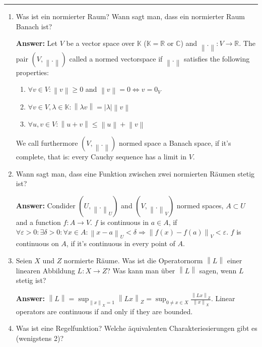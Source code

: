 \documentclass[11pt]{article}
\newcommand{\norm}[1]{\left\lVert#1\right\rVert}
\newcommand{\abs}[1]{\left|#1\right|}
\begin{document}


\medskip\hrule
\begin{enumerate}
    \item Was ist ein normierter Raum? Wann sagt man, dass ein normierter Raum Banach ist?

    \textbf{Answer:} Let $V$ be a vector space over $\mathbb{K}$ ($\mathbb{K} = \mathbb{R}$ or $\mathbb{C}$) and $\norm{.}\colon V \to \mathbb{R}$. The pair $(V, \norm{.})$ called a normed vectorspace if $\norm{.}$ satisfies the following properties:
    \begin{enumerate}
        \item $\forall v \in V\colon \norm{v} \ge 0$ and $\norm{v} = 0 \Leftrightarrow v = 0_V$
        \item $\forall v \in V, \lambda \in \mathbb{K}\colon \norm{\lambda v} = \abs{\lambda} \norm{v}$
        \item $\forall u, v \in V\colon \norm{u + v} \le \norm{u} + \norm{v}$
    \end{enumerate}
    We call furthermore $(V, \norm{.})$ normed space a Banach space, if it's complete, that is: every Cauchy sequence has a limit in $V$.

    \item Wann sagt man, dass eine Funktion zwischen zwei normierten Räumen stetig ist?

    \textbf{Answer:} Condider $(U, \norm{.}_U)$ and $(V, \norm{.}_V)$ normed spaces, $A \subset U$ and a function $f\colon A \to V$. $f$ is continuous in $a \in A$, if $\forall \varepsilon > 0\colon \exists \delta > 0\colon \forall x\in A\colon \norm{x - a}_U < \delta \Rightarrow \norm{f(x) - f(a)}_V < \varepsilon$. $f$ is continuous on $A$, if it's continuous in every point of $A$.

    \item Seien $X$ und $Z$ normierte Räume. Was ist die Operatornorm $\norm{L}$ einer linearen Abbildung $L\colon X \to Z$? Was kann man über $\norm{L}$ sagen, wenn $L$ stetig ist?

    \textbf{Answer:} $\norm{L} = \sup_{\norm{x}_X = 1} \norm{L x}_Z = \sup_{0\neq x \in X}\frac{\norm{L x}_Z}{\norm{x}_X}$. Linear operators are continuous if and only if they are bounded.

    \item Was ist eine Regelfunktion? Welche äquivalenten Charakteriesierungen gibt es (wenigstens 2)?


\end{enumerate}
\end{document}
